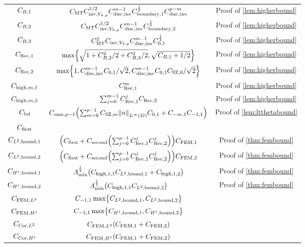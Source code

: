 \begin{longtabu}{ccc}
  $C_{B,1}$&$C_{\mathrm{MT}} C_{\mathrm{inv},V_{h,p}}^{1/2} C_{\mathrm{disc},\mathrm{inv}}^{m-1} C_{\mathrm{boundary},1}^{\frac{1}{2}} C_{\mathrm{disc},\mathrm{inv}}^{p-m}$&Proof of \cref{lem:higherbound}\\
  $C_{B,2}$&$C_{\mathrm{MT}} C_{\mathrm{inv},V_{h,p}}^{1/2} C_{\mathrm{disc},\mathrm{inv}}^{m-1} C_{\mathrm{boundary},2}^{\frac{1}{2}}$&Proof of \cref{lem:higherbound}\\
  $C_{B,3}$&$C_{\mathrm{MT}}^2 C_{\mathrm{inv},V_{h,p}} C_{\mathrm{disc},\mathrm{inv}}^{m-1}C_{0,1}^{\frac{1}{2}}$&Proof of \cref{lem:higherbound}\\
  $C_{\mathrm{Rec},1}$&$\max\set{\sqrt{1 + \CBt^2/2 + \CBth^2/2},\sqrt{\CBo + 1/2}}$&Proof of \cref{lem:higherbound}\\
  $C_{\mathrm{Rec},2}$&$\max\set{1,\Chinv^{m-1}\Cfn{0,1}/\sqrt{2},\Chinv^{m-1}\Cfn{0,1}\CSZfn{0}/\sqrt{2}}$&Proof of \cref{lem:higherbound}\\
  $C_{\mathrm{high},m,1}$ & $C_{\mathrm{Rec},1}^m$&Proof of \cref{lem:higherbound}\\
  $C_{\mathrm{high},m,2}$ &$\sum_{j=0}^{m-1} C_{\mathrm{Rec},1}^j C_{\mathrm{Rec},2}$&Proof of \cref{lem:higherbound}\\
  $C_{\mathrm{bd}}$ &$\Csumfn{p-1}\mleft(\sum_{m=0}^{p-1} \CSZfn{m} \NLiD{n}\Cfn{0,1} + \Cfn{-m,1}\Cfn{-1,1}\mright)$&Proof of \cref{lem:ltthetabound}\\
  $C_{\mathrm{first}}$ &&\\
  $C_{L^{2},\mathrm{bound},1}$&$\mleft(\Cfirst+ \Csecond \mleft(\sum_{j=0}^{p-1} \CReco^j \CRect^j\mright)\mright) \CFEMotilde$&Proof of \cref{thm:fembound}\\
  $C_{L^{2},\mathrm{bound},2}$&$\mleft(\Cfirst+ \Csecond \mleft(\sum_{j=0}^{p-1} \CReco^j \CRect^j\mright)\mright)\CFEMttilde$&Proof of \cref{thm:fembound}\\
  $C_{H^{1},\mathrm{bound},1}$&$\Amin^{\half} \mleft(\Chighfn{1,1}\CLtboundo + \Chighfn{1,2}\mright)$&Proof of \cref{thm:fembound}\\
  $C_{H^{1},\mathrm{bound},2}$&$\Amin^{\half} \mleft(\Chighfn{1,1}\CLtboundt\mright)$&Proof of \cref{thm:fembound}\\
  $C_{\mathrm{FEM},L^{2}}$&$\Cfn{-1,1} \max\set{\CLtboundo,\CLtboundt}$&\\
  $C_{\mathrm{FEM},H^{1}}$&$ \Cfn{-1,1}\max\set{\CHoboundo,\CHoboundt}$&\\
  $C_{\mathrm{Cor},L^{2}}$&$\CFEMLt\mleft(\CFEMo+\CFEMt\mright)$&\\
  $C_{\mathrm{Cor},H^{1}}$&$\CFEMHo\mleft(\CFEMotilde+\CFEMttilde\mright)$&\\
\bottomrule
\end{longtabu}

